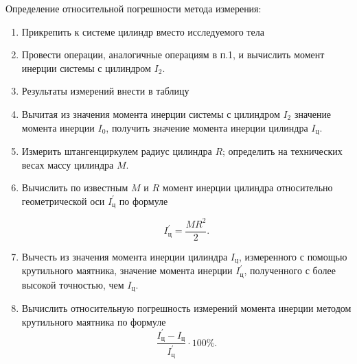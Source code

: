 \item Определение относительной погрешности метода измерения:
    \begin{enumerate}
        \item Прикрепить к системе цилиндр вместо исследуемого тела
        \item Провести операции, аналогичные операциям в п.1, и вычислить момент инерции системы с цилиндром $I_2$.
        \item Результаты измерений внести в таблицу
        \item Вычитая из значения момента инерции системы с цилиндром $I_2$ значение момента инерции $I_0$, получить значение момента инерции цилиндра $I_\text{ц}$.
        \item Измерить штангенциркулем радиус цилиндра $R$;
        определить на технических весах массу цилиндра $M$.
        \item Вычислить по известным $M$ и $R$ момент инерции цилиндра относительно геометрической оси $I_\text{ц}^{'}$ по формуле
        
        \begin{equation*}
            I_\text{ц}^{'} = \frac{MR^2}{2}.
        \end{equation*}
        
        \item Вычесть из значения момента инерции цилиндра $I_\text{ц}$,
        измеренного с помощью крутильного маятника, значение момента инерции $I_\text{ц}^{'}$,
        полученного с более высокой точностью, чем $I_\text{ц}$.
        \item Вычислить относительную погрешность измерений момента инерции методом крутильного маятника по формуле
        \begin{equation*}
            \frac{I_\text{ц}^{'} - I_\text{ц}}{I_\text{ц}^{'}} \cdot 100 \%. 
        \end{equation*}
    \end{enumerate}